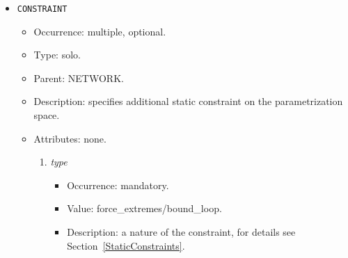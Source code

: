 \documentclass[12pt]{article}
\newenvironment{menum}{
\begin{enumerate}
  \setlength{\itemsep}{0pt}
  \setlength{\parskip}{0pt}
  \setlength{\parsep}{0pt}
}{\end{enumerate}}
\newenvironment{mitem}{
\begin{itemize}
  \setlength{\itemsep}{0pt}
  \setlength{\parskip}{0pt}
  \setlength{\parsep}{0pt}
}{\end{itemize}}
\begin{document}
\begin{mitem}
	\item \texttt{CONSTRAINT}
	\begin{mitem}
		\item Occurrence: multiple, optional.
		\item Type: solo.
		\item Parent: NETWORK.
		\item Description: specifies additional static constraint on the parametrization space.
		\item Attributes: none.
		\begin{menum}
			\item \textit{type} 
			\begin{mitem}
				\item Occurrence: mandatory.
				\item Value: force\_extremes/bound\_loop.
				\item Description: a nature of the constraint, for details see Section~\ref{StaticConstraints}.
			\end{mitem}
		\end{menum}
	\end{mitem}
\end{mitem}
	
\end{document}
